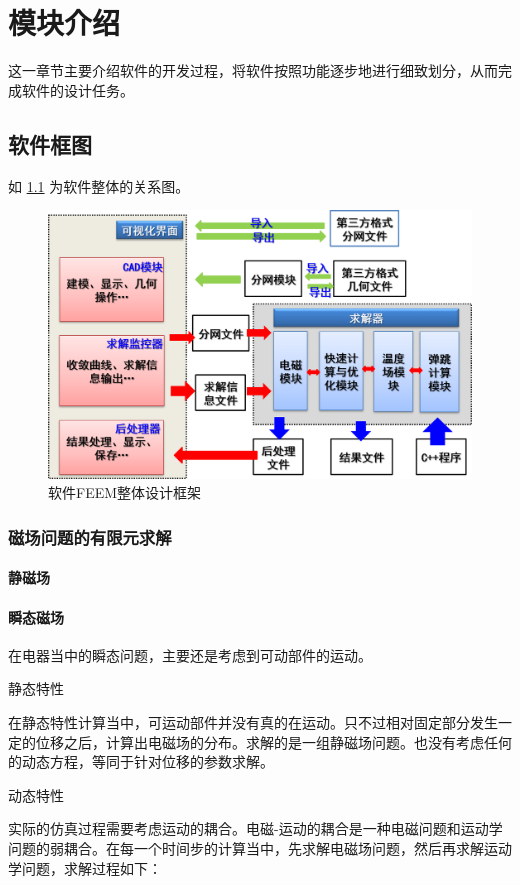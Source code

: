 \chapter{模块介绍}
这一章节主要介绍软件的开发过程，将软件按照功能逐步地进行细致划分，从而完成软件的设计任务。
\section{软件框图}
如 \figurename{} \ref{fig:softarch} 为软件整体的关系图。
\begin{figure}[h]
	\centering
	\includegraphics[width=0.7\linewidth]{figures/softarch}
	\caption{软件FEEM整体设计框架}
	\label{fig:softarch}
\end{figure}

\subsection{磁场问题的有限元求解}

\subsubsection{静磁场}

\subsubsection{瞬态磁场}
在电器当中的瞬态问题，主要还是考虑到可动部件的运动。

静态特性

在静态特性计算当中，可运动部件并没有真的在运动。只不过相对固定部分发生一定的位移之后，计算出电磁场的分布。求解的是一组静磁场问题。也没有考虑任何的动态方程，等同于针对位移的参数求解。

动态特性

实际的仿真过程需要考虑运动的耦合。电磁-运动的耦合是一种电磁问题和运动学问题的弱耦合。在每一个时间步的计算当中，先求解电磁场问题，然后再求解运动学问题，求解过程如下：

